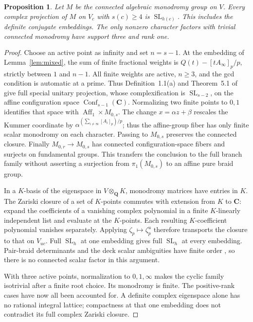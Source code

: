 \documentclass[11pt]{article}
\newtheorem{proposition}[theorem]{Proposition}
\theoremstyle{definition}
\newcommand{\Q}{\mathbf Q}
\newcommand{\C}{\mathbf C}
\newcommand{\SL}{\operatorname{SL}}
\begin{document}
\begin{proposition}\label{prop:projections}
Let $M$ be the connected algebraic monodromy group on $V$. Every complex
projection of $M$ on $V_c$ with $s(c)\geq4$ is $\SL_{h(c)}$. This includes
the definite conjugate embeddings. The only nonzero character factors with
trivial connected monodromy have support three and rank one.
\end{proposition}
\begin{proof}
Choose an active point as infinity and set $n=s-1$. At the embedding of
Lemma~\ref{lem:mixed}, the sum of finite fractional weights is
$Q(t)-[tA_\infty]_p/p$, strictly between $1$ and $n-1$. All finite
weights are active, $n\geq3$, and the gcd condition is automatic at a prime.
Thus Definition~1.1(a) and Theorem~5.1 of \cite{MN} give full special
unitary projection, whose complexification is $\SL_{s-2}$, on the affine
configuration space $\operatorname{Conf}_{s-1}(\C)$. Normalizing two finite
points to $0,1$ identifies that space with
$\operatorname{Aff}_1\times M_{0,s}$. The change $x=\alpha z+\beta$
rescales the Kummer coordinate by
$\alpha^{(\sum_{i\ne\infty}[A_i]_p)/p}$; thus the affine-group fiber
has only finite scalar monodromy on each character. Passing to $M_{0,s}$
preserves the connected closure. Finally $M_{0,r}\to M_{0,s}$ has
connected configuration-space fibers and surjects on fundamental groups.
This transfers the conclusion to the full branch family without asserting
a surjection from $\pi_1(M_{0,s})$ to an affine pure braid group.

In a $K$-basis of the eigenspace in $V\otimes_\Q K$, monodromy matrices
have entries in $K$. The Zariski closure of a set of $K$-points commutes with
extension from $K$ to $\C$: expand the coefficients of a vanishing complex
polynomial in a finite $K$-linearly independent list and evaluate at the
$K$-points. Each resulting $K$-coefficient polynomial vanishes separately.
Applying $\zeta_p\mapsto\zeta_p^u$ therefore transports the closure to
that on $V_{uc}$. Full $\SL_h$ at one embedding gives full $\SL_h$ at
every embedding. Pair-braid determinants and the deck scalar ambiguities
have finite order \cite[Corollary~2.7]{MN}, so there is no connected scalar
factor in this argument.

With three active points, normalization to $0,1,\infty$ makes the cyclic
family isotrivial after a finite root choice. Its monodromy is finite.
The positive-rank cases have now all been accounted for. A definite complex
eigenspace alone has no rational integral lattice; compactness at that one
embedding does not contradict its full complex Zariski closure.
\end{proof}
\end{document}
